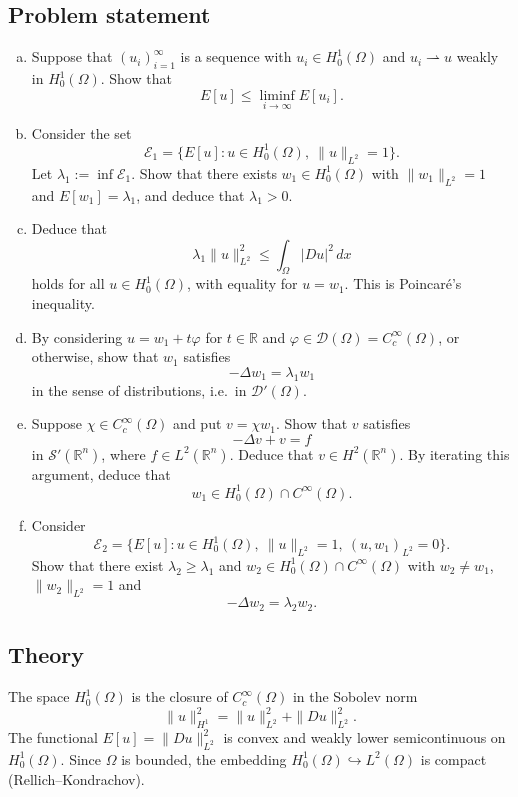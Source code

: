 \documentclass[12pt,a4paper]{article}
\theoremstyle{plain}
\theoremstyle{definition}
\theoremstyle{remark}
\theoremstyle{remark}
\begin{document}
\subsection*{Problem statement}

\begin{enumerate}[(a)]
	\item Suppose that $(u_i)_{i=1}^\infty$ is a sequence with
	$u_i\in H_0^1(\Omega)$ and $u_i\rightharpoonup u$ weakly in $H_0^1(\Omega)$.
	Show that
	\[
	E[u]\le \liminf_{i\to\infty}E[u_i].
	\]
	
	\item Consider the set
	\[
	\mathcal{E}_1=\{E[u]:u\in H_0^1(\Omega),\ \|u\|_{L^2}=1\}.
	\]
	Let $\lambda_1:=\inf\mathcal{E}_1$. Show that there exists
	$w_1\in H_0^1(\Omega)$ with $\|w_1\|_{L^2}=1$ and $E[w_1]=\lambda_1$, and
	deduce that $\lambda_1>0$.
	
	\item Deduce that
	\[
	\lambda_1\|u\|_{L^2}^2\le \int_\Omega |Du|^2\,dx
	\]
	holds for all $u\in H_0^1(\Omega)$, with equality for $u=w_1$.
	This is Poincar\'e's inequality.
	
	\item By considering $u=w_1+t\varphi$ for $t\in\mathbb{R}$ and
	$\varphi\in\mathcal{D}(\Omega)=C_c^\infty(\Omega)$, or otherwise,
	show that $w_1$ satisfies
	\[
	-\Delta w_1=\lambda_1 w_1
	\]
	in the sense of distributions, i.e.\ in $\mathcal{D}'(\Omega)$.
	
	\item[\textnormal{(e)}] Suppose $\chi\in C_c^\infty(\Omega)$ and put $v=\chi w_1$.
	Show that $v$ satisfies
	\[
	-\Delta v + v = f
	\]
	in $\mathcal{S}'(\mathbb{R}^n)$, where $f\in L^2(\mathbb{R}^n)$.
	Deduce that $v\in H^2(\mathbb{R}^n)$. By iterating this argument, deduce that
	\[
	w_1\in H_0^1(\Omega)\cap C^\infty(\Omega).
	\]
	
	\item[\textnormal{(f)}] Consider
	\[
	\mathcal{E}_2=\{E[u]:u\in H_0^1(\Omega),\ \|u\|_{L^2}=1,\ (u,w_1)_{L^2}=0\}.
	\]
	Show that there exist $\lambda_2\ge\lambda_1$ and
	$w_2\in H_0^1(\Omega)\cap C^\infty(\Omega)$ with
	$w_2\neq w_1$, $\|w_2\|_{L^2}=1$ and
	\[
	-\Delta w_2=\lambda_2 w_2.
	\]
\end{enumerate}

\subsection*{Theory}

The space $H_0^1(\Omega)$ is the closure of $C_c^\infty(\Omega)$ in the
Sobolev norm
\[
\|u\|_{H^1}^2=\|u\|_{L^2}^2+\|Du\|_{L^2}^2.
\]
The functional $E[u]=\|Du\|_{L^2}^2$ is convex and weakly lower semicontinuous
on $H_0^1(\Omega)$. Since $\Omega$ is bounded, the embedding
$H_0^1(\Omega)\hookrightarrow L^2(\Omega)$ is compact (Rellich--Kondrachov).
\end{document}
